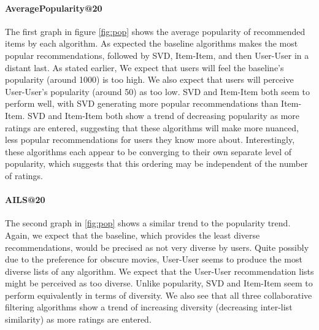 \documentclass[letterpaper]{sig-alternate}
\begin{document}
  \paragraph{AveragePopularity@20}
  The first graph in figure \ref{fig:pop} shows the average popularity of recommended items by each algorithm.
  As expected the baseline algorithms makes the most popular recommendations, followed by SVD, Item-Item, and then User-User in a distant last.
  As stated earlier, We expect that users will feel the baseline's popularity (around 1000) is too high.
  We also expect that users will perceive User-User's popularity (around 50) as too low.
  SVD and Item-Item both seem to perform well, with SVD generating more popular recommendations than Item-Item.
  SVD and Item-Item both show a trend of decreasing popularity as more ratings are entered, suggesting that these algorithms will make more nuanced, less popular recommendations for users they know more about.
  Interestingly, these algorithms each appear to be converging to their own separate level of popularity, which suggests that this ordering may be independent of the number of ratings.

  \paragraph{AILS@20}
  The second graph in \ref{fig:pop} shows a similar trend to the popularity trend.
  Again, we expect that the baseline, which provides the least diverse recommendations, would be precised as not very diverse by users.
  Quite possibly due to the preference for obscure movies, User-User seems to produce the most diverse lists of any algorithm.
  We expect that the User-User recommendation lists might be perceived as too diverse.
  Unlike popularity, SVD and Item-Item seem to perform equivalently in terms of diversity.
  We also see that all three collaborative filtering algorithms show a trend of increasing diversity (decreasing  inter-list similarity) as more ratings are entered.

\end{document}
